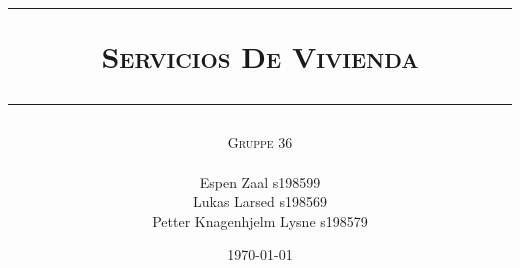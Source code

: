 \begin{titlepage}
 



\title{
\rule{\linewidth}{0.5mm}
\textsc{\LARGE Servicios De Vivienda}
\rule{\linewidth}{0.5mm}
}





\author{\textsc{\Large Gruppe 36}\\ \hline \\ Espen Zaal s198599\\Lukas Larsed s198569\\Petter Knagenhjelm Lysne s198579}



\date{\today}



\end{titlepage}
